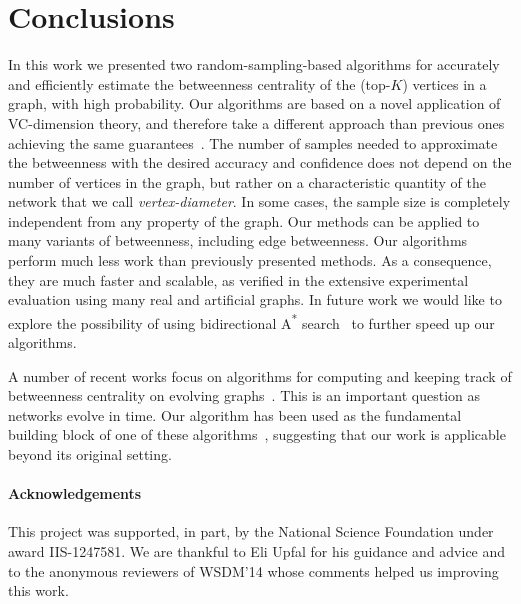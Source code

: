 \section{Conclusions}\label{sec:concl}
In this work we presented two random-sampling-based algorithms for accurately and
efficiently estimate the betweenness centrality of the (top-$K$) vertices in a
graph, with high probability.
Our algorithms are based on a novel application of VC-dimension theory, and
therefore take a different approach than previous ones achieving the same
guarantees~\citep{BrandesP07,GeisbergerSS08,JacobKLPT05}. The number of samples
needed to approximate the betweenness with the desired accuracy and confidence
does not depend on the number of vertices in the graph, but rather on a
characteristic quantity of the network that we call
\emph{vertex-diameter}. In some cases, the sample size is completely
independent from any property of the graph. %
\ifproof
Our methods can be applied to many variants of betweenness, including edge
betweenness. %
\fi
Our algorithms perform much less work than previously presented methods. %
As a consequence, they are much faster and
scalable, as verified in the extensive experimental
evaluation using many real and artificial graphs. 
\ifdmkd
\else
In future work we would like
to explore the possibility of using bidirectional A\textsuperscript{*}
search~\citep{Pohl69,KaindlK97} to further speed up our algorithms.  
\fi

A number of recent works focus on algorithms for computing and keeping track of
betweenness centrality on evolving
graphs~\citep{KourtellisMB14,Yoshida14,BergaminiMS15,BergaminiM15}. This is an
important question as networks evolve in time. Our algorithm has been used as
the fundamental building block of one of these
algorithms~\citep{BergaminiMS15,BergaminiM15}, suggesting that our work is
applicable beyond its original setting.


\ifdmkd
\else
\paragraph*{Acknowledgements} This project was supported, in part, by the
National Science Foundation under award IIS-1247581. We are thankful to Eli
Upfal for his guidance and advice and to the anonymous reviewers of WSDM'14
whose comments helped us improving this work.
\fi

